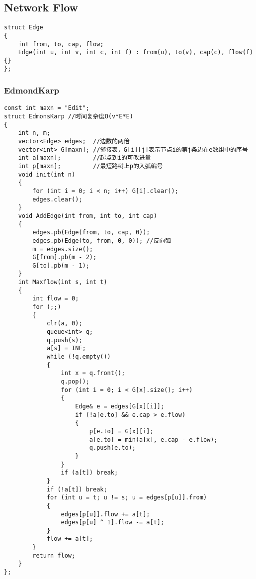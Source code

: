 \documentclass[twoside]{article}
\begin{document}
\subsection{Network Flow}
\begin{lstlisting}
struct Edge
{
    int from, to, cap, flow;
    Edge(int u, int v, int c, int f) : from(u), to(v), cap(c), flow(f) {}
};
\end{lstlisting}
\subsubsection{EdmondKarp}
\begin{lstlisting}
const int maxn = "Edit";
struct EdmonsKarp //时间复杂度O(v*E*E)
{
    int n, m;
    vector<Edge> edges;  //边数的两倍
    vector<int> G[maxn]; //邻接表，G[i][j]表示节点i的第j条边在e数组中的序号
    int a[maxn];         //起点到i的可改进量
    int p[maxn];         //最短路树上p的入弧编号
    void init(int n)
    {
        for (int i = 0; i < n; i++) G[i].clear();
        edges.clear();
    }
    void AddEdge(int from, int to, int cap)
    {
        edges.pb(Edge(from, to, cap, 0));
        edges.pb(Edge(to, from, 0, 0)); //反向弧
        m = edges.size();
        G[from].pb(m - 2);
        G[to].pb(m - 1);
    }
    int Maxflow(int s, int t)
    {
        int flow = 0;
        for (;;)
        {
            clr(a, 0);
            queue<int> q;
            q.push(s);
            a[s] = INF;
            while (!q.empty())
            {
                int x = q.front();
                q.pop();
                for (int i = 0; i < G[x].size(); i++)
                {
                    Edge& e = edges[G[x][i]];
                    if (!a[e.to] && e.cap > e.flow)
                    {
                        p[e.to] = G[x][i];
                        a[e.to] = min(a[x], e.cap - e.flow);
                        q.push(e.to);
                    }
                }
                if (a[t]) break;
            }
            if (!a[t]) break;
            for (int u = t; u != s; u = edges[p[u]].from)
            {
                edges[p[u]].flow += a[t];
                edges[p[u] ^ 1].flow -= a[t];
            }
            flow += a[t];
        }
        return flow;
    }
};
\end{lstlisting}
\end{document}
